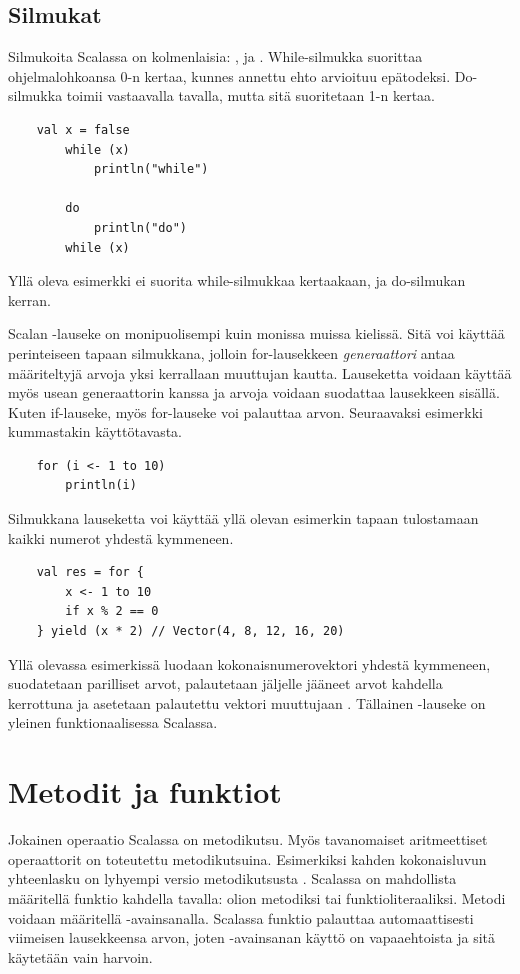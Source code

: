 \subsection{Silmukat}
Silmukoita Scalassa on kolmenlaisia: ,  ja . While-silmukka suorittaa ohjelmalohkoansa 0-n kertaa, kunnes annettu ehto arvioituu epätodeksi. Do-silmukka toimii vastaavalla tavalla, mutta sitä suoritetaan 1-n kertaa.
\begin{lstlisting}
    val x = false
		while (x)
			println("while")
		
		do
			println("do")
        while (x)
\end{lstlisting}
Yllä oleva esimerkki ei suorita while-silmukkaa kertaakaan, ja do-silmukan kerran.
\cite[Luku 2.5]{scalaForTheImpatient}

Scalan -lauseke on monipuolisempi kuin monissa muissa kielissä. Sitä voi käyttää perinteiseen tapaan silmukkana, jolloin for-lausekkeen \textit{generaattori} antaa määriteltyjä arvoja yksi kerrallaan muuttujan  kautta. Lauseketta voidaan käyttää myös usean generaattorin kanssa ja arvoja voidaan suodattaa lausekkeen sisällä. Kuten if-lauseke, myös for-lauseke voi palauttaa arvon. Seuraavaksi esimerkki kummastakin käyttötavasta.
\begin{lstlisting}
    for (i <- 1 to 10)
        println(i)
\end{lstlisting}
Silmukkana lauseketta voi käyttää yllä olevan esimerkin tapaan tulostamaan kaikki numerot yhdestä kymmeneen.
\begin{lstlisting}
    val res = for {
        x <- 1 to 10
        if x % 2 == 0
    } yield (x * 2) // Vector(4, 8, 12, 16, 20)
\end{lstlisting}
Yllä olevassa esimerkissä luodaan kokonaisnumerovektori yhdestä kymmeneen, suodatetaan parilliset arvot, palautetaan jäljelle jääneet arvot kahdella kerrottuna ja asetetaan palautettu vektori muuttujaan . Tällainen -lauseke on yleinen funktionaalisessa Scalassa.
\cite[Luku 2.6]{scalaForTheImpatient}


\section{Metodit ja funktiot} \label{MetoditJaFunktiot}
Jokainen operaatio Scalassa on metodikutsu. Myös tavanomaiset aritmeettiset operaattorit on toteutettu metodikutsuina. Esimerkiksi kahden kokonaisluvun yhteenlasku  on lyhyempi versio metodikutsusta . Scalassa on mahdollista määritellä funktio kahdella tavalla: olion metodiksi tai funktioliteraaliksi. Metodi voidaan määritellä -avainsanalla.
Scalassa funktio palauttaa automaattisesti viimeisen lausekkeensa arvon, joten -avainsanan käyttö on vapaaehtoista ja sitä käytetään vain harvoin.
\cite[Luku 1.4]{scalaForTheImpatient}
\cite[Basics]{tourOfScala}


